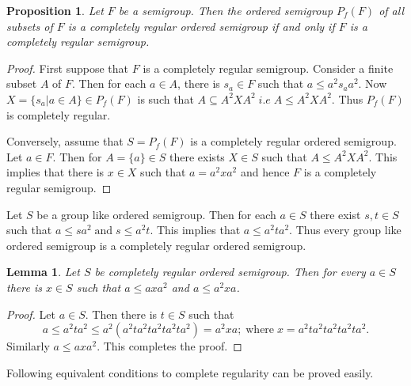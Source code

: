 \documentclass[13pt]{article}
\newtheorem{Lemma}[theorem]{Lemma}
\newtheorem{Proposition}[theorem]{Proposition}
\theoremstyle{definition}
\theoremstyle{remark}
\numberwithin{equation}{section}
\begin{document}
\begin{Proposition}\label{cr9}
Let $F$ be  a  semigroup. Then the ordered semigroup $P_f(F)$ of all
subsets of $F$  is a completely regular ordered semigroup if and
only if $F$ is a completely regular semigroup.
\end{Proposition}
\begin{proof}
First suppose that $F $ is a completely regular  semigroup. Consider
a finite subset $A$ of  $F$. Then for each $a \in A$, there is
$s_{a} \in F$ such that $a \leq a^{2} s_{a} a^{2}$. Now $X =
\{s_{a}| a \in A\} \in P_f(F)$ is such that $A \subseteq A^{2} X
A^{2} \;i.e \;A \leq A^{2} X A^{2}$. Thus  $ P_f(F)$ is completely
regular.

Conversely, assume that $S= P_f(F)$ is a completely regular ordered
semigroup. Let $a \in F$. Then for $A = \{a \}\in S$ there exists $X
\in S$ such that $A \leq A^{2} X A^{2}$. This implies that there is
$x \in X$ such that $a = a^{2} x a^{2}$ and hence $F$ is a
completely regular semigroup.
\end{proof}
Let $S$ be a group like ordered semigroup. Then for each $a \in S$
there exist $s, t \in S$ such that $a \leq s a^{2} \;\textrm{and}
\;s \leq a^{2}t$. This implies that $a \leq a^{2} t a^{2}$. Thus
every group like ordered semigroup is a completely regular ordered
semigroup.
\begin{Lemma}\label{cr10.1}
Let $S$ be completely regular ordered semigroup. Then for every $a
\in S$ there is $x \in S$ such that $a \leq axa^2$ and $a \leq a^2
xa$.
\end{Lemma}
\begin{proof}
Let $a \in S$. Then there is $t \in S$ such that $$a \leq a^2ta^2
\leq a^2(a^2ta^2ta^2ta^2ta^2)=a^2xa; \;\textrm{where} \;x=
a^2ta^2ta^2ta^2ta^2.$$ Similarly $a \leq axa^2$. This completes the
proof.
\end{proof}

Following  equivalent conditions to complete regularity can be
proved easily.
\end{document}
